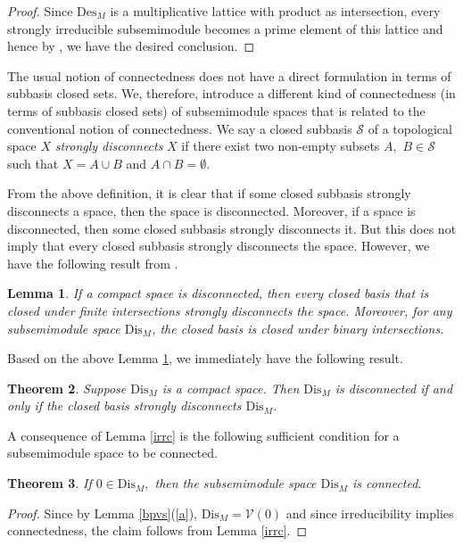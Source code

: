 \documentclass[12pt,english]{smfart}
\newtheorem{theorem}{Theorem}[section]
\newtheorem{lemma}[theorem]{Lemma}
\theoremstyle{definition}
\begin{document}
\begin{proof} 
Since $\mathrm{Des}_M$ is a multiplicative lattice with product as intersection, every strongly irreducible subsemimodule becomes a prime element of this lattice and hence by \cite[Lemma 2.6]{FFJ22},  we have the desired conclusion.
\end{proof}

The usual notion of connectedness does not have a direct formulation in terms of subbasis closed sets. We, therefore, introduce a different kind of connectedness (in terms of subbasis closed sets) of subsemimodule spaces that is related to the conventional notion of connectedness.
We say a closed subbasis $\mathcal{S}$ of a topological space $X$ \emph{strongly disconnects} $X$  if there exist two non-empty subsets $A,$ $B\in\mathcal{S}$ such that $X=A\cup B$ and $A\cap B=\emptyset$.


From the above definition, it is clear that if some closed subbasis strongly disconnects a space, then the space is disconnected. Moreover, if a space is disconnected, then some closed subbasis strongly disconnects it. But this does not imply that every closed subbasis strongly disconnects the space. However, we have the following result from \cite{DG22}.

\begin{lemma}\label{th1}
If a compact space is disconnected, then every closed basis that is closed under finite intersections strongly disconnects the space. Moreover, for any subsemimodule space $\mathrm{Dis}_M$, the closed basis is closed under binary intersections.
\end{lemma}

Based on the above Lemma \ref{th1}, we immediately have the following result.

\begin{theorem}\label{cor1}
Suppose $\mathrm{Dis}_M$ is a compact space. Then  $\mathrm{Dis}_M$ is  disconnected if and only if the closed basis strongly disconnects $\mathrm{Dis}_M$. 
\end{theorem}   

A consequence of Lemma \ref{irrc} is the following sufficient condition for a subsemimodule space to be connected. 

\begin{theorem}\label{conis}
If  $0\in\mathrm{Dis}_M,$  then the subsemimodule space $\mathrm{Dis}_M$ is connected.
\end{theorem}  

\begin{proof}
Since by Lemma \ref{bpvs}(\ref{a}), $\mathrm{Dis}_M=\mathcal{V}(0)$ and since irreducibility implies connectedness, the claim follows from Lemma \ref{irrc}. 
\end{proof}
\end{document}
